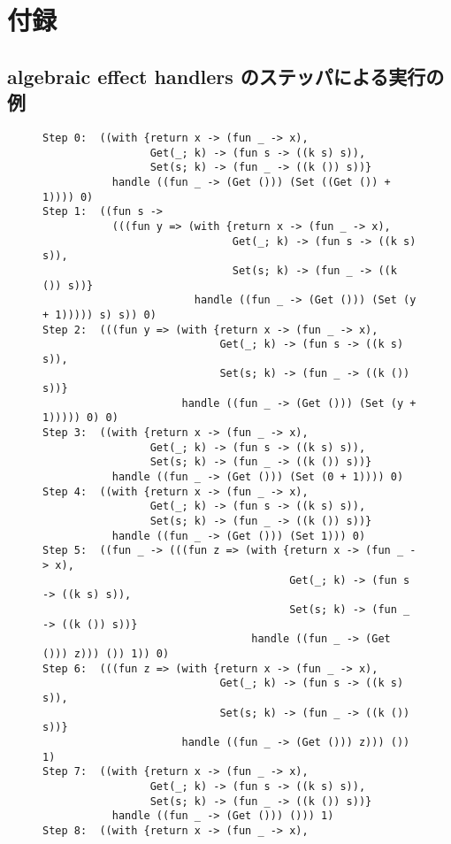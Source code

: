 \appendix
\section{付録}

\subsection{algebraic effect handlers のステッパによる実行の例}
\label{subsection:step_example}

\begin{figure}
\begin{spacing}{0.8}
\begin{verbatim}
Step 0:  ((with {return x -> (fun _ -> x),
                 Get(_; k) -> (fun s -> ((k s) s)),
                 Set(s; k) -> (fun _ -> ((k ()) s))}
           handle ((fun _ -> (Get ())) (Set ((Get ()) + 1)))) 0)
Step 1:  ((fun s ->
           (((fun y => (with {return x -> (fun _ -> x),
                              Get(_; k) -> (fun s -> ((k s) s)),
                              Set(s; k) -> (fun _ -> ((k ()) s))}
                        handle ((fun _ -> (Get ())) (Set (y + 1))))) s) s)) 0)
Step 2:  (((fun y => (with {return x -> (fun _ -> x),
                            Get(_; k) -> (fun s -> ((k s) s)),
                            Set(s; k) -> (fun _ -> ((k ()) s))}
                      handle ((fun _ -> (Get ())) (Set (y + 1))))) 0) 0)
Step 3:  ((with {return x -> (fun _ -> x),
                 Get(_; k) -> (fun s -> ((k s) s)),
                 Set(s; k) -> (fun _ -> ((k ()) s))}
           handle ((fun _ -> (Get ())) (Set (0 + 1)))) 0)
Step 4:  ((with {return x -> (fun _ -> x),
                 Get(_; k) -> (fun s -> ((k s) s)),
                 Set(s; k) -> (fun _ -> ((k ()) s))}
           handle ((fun _ -> (Get ())) (Set 1))) 0)
Step 5:  ((fun _ -> (((fun z => (with {return x -> (fun _ -> x),
                                       Get(_; k) -> (fun s -> ((k s) s)),
                                       Set(s; k) -> (fun _ -> ((k ()) s))}
                                 handle ((fun _ -> (Get ())) z))) ()) 1)) 0)
Step 6:  (((fun z => (with {return x -> (fun _ -> x),
                            Get(_; k) -> (fun s -> ((k s) s)),
                            Set(s; k) -> (fun _ -> ((k ()) s))}
                      handle ((fun _ -> (Get ())) z))) ()) 1)
Step 7:  ((with {return x -> (fun _ -> x),
                 Get(_; k) -> (fun s -> ((k s) s)),
                 Set(s; k) -> (fun _ -> ((k ()) s))}
           handle ((fun _ -> (Get ())) ())) 1)
Step 8:  ((with {return x -> (fun _ -> x),

\end{verbatim}
\end{spacing}
\end{figure}
